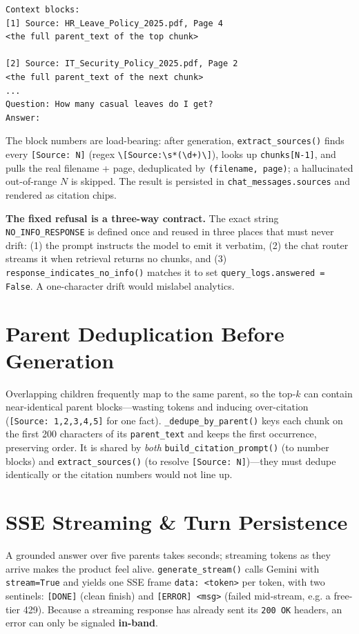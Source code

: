 \documentclass[11pt,a4paper,oneside]{report}
\newcommand{\code}[1]{\texttt{#1}}
\begin{document}
\begin{lstlisting}[language=none,caption={Numbered context-block layout fed to Gemini.}]
Context blocks:
[1] Source: HR_Leave_Policy_2025.pdf, Page 4
<the full parent_text of the top chunk>

[2] Source: IT_Security_Policy_2025.pdf, Page 2
<the full parent_text of the next chunk>
...
Question: How many casual leaves do I get?
Answer:
\end{lstlisting}

The block numbers are load-bearing: after generation, \code{extract\_sources()} finds every
\code{[Source: N]} (regex \code{\textbackslash[Source:\textbackslash s*(\textbackslash d+)\textbackslash]}),
looks up \code{chunks[N-1]}, and pulls the real filename + page, deduplicated by
\code{(filename, page)}; a hallucinated out-of-range $N$ is skipped. The result is persisted in
\code{chat\_messages.sources} and rendered as citation chips.

\begin{keyidea}
\textbf{The fixed refusal is a three-way contract.} The exact string \code{NO\_INFO\_RESPONSE} is
defined once and reused in three places that must never drift: (1) the prompt instructs the model to
emit it verbatim, (2) the chat router streams it when retrieval returns no chunks, and (3)
\code{response\_indicates\_no\_info()} matches it to set \code{query\_logs.answered = False}. A
one-character drift would mislabel analytics.
\end{keyidea}

\section{Parent Deduplication Before Generation}
Overlapping children frequently map to the same parent, so the top-$k$ can contain near-identical
parent blocks---wasting tokens and inducing over-citation (\code{[Source: 1,2,3,4,5]} for one fact).
\code{\_dedupe\_by\_parent()} keys each chunk on the first 200 characters of its \code{parent\_text}
and keeps the first occurrence, preserving order. It is shared by \emph{both}
\code{build\_citation\_prompt()} (to number blocks) and \code{extract\_sources()} (to resolve
\code{[Source: N]})---they must dedupe identically or the citation numbers would not line up.

\section{SSE Streaming \& Turn Persistence}
A grounded answer over five parents takes seconds; streaming tokens as they arrive makes the product
feel alive. \code{generate\_stream()} calls Gemini with \code{stream=True} and yields one SSE frame
\code{data: <token>} per token, with two sentinels: \code{[DONE]} (clean finish) and
\code{[ERROR] <msg>} (failed mid-stream, e.g. a free-tier 429). Because a streaming response has
already sent its \code{200 OK} headers, an error can only be signaled \textbf{in-band}.
\end{document}
